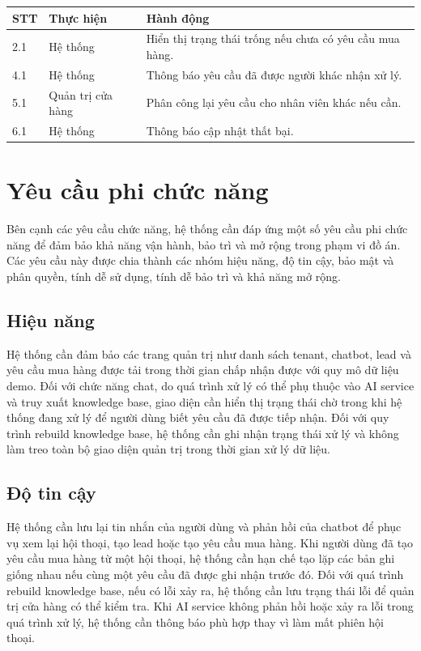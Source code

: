 \documentclass[../DoAn.tex]{subfiles}
\begin{document}
\begin{table}[H]
\centering
\begin{tabular}{|p{}|p{}|p{}|}
\hline
\textbf{STT} & \textbf{Thực hiện} & \textbf{Hành động} \\
\hline
2.1 & Hệ thống & Hiển thị trạng thái trống nếu chưa có yêu cầu mua hàng. \\
\hline
4.1 & Hệ thống & Thông báo yêu cầu đã được người khác nhận xử lý. \\
\hline
5.1 & Quản trị cửa hàng & Phân công lại yêu cầu cho nhân viên khác nếu cần. \\
\hline
6.1 & Hệ thống & Thông báo cập nhật thất bại. \\
\hline
\end{tabular}
\end{table}

\section{Yêu cầu phi chức năng}
\label{section:2.4}

Bên cạnh các yêu cầu chức năng, hệ thống cần đáp ứng một số yêu cầu phi chức năng để đảm bảo khả năng vận hành, bảo trì và mở rộng trong phạm vi đồ án. Các yêu cầu này được chia thành các nhóm hiệu năng, độ tin cậy, bảo mật và phân quyền, tính dễ sử dụng, tính dễ bảo trì và khả năng mở rộng.

\subsection{Hiệu năng}

Hệ thống cần đảm bảo các trang quản trị như danh sách tenant, chatbot, lead và yêu cầu mua hàng được tải trong thời gian chấp nhận được với quy mô dữ liệu demo. Đối với chức năng chat, do quá trình xử lý có thể phụ thuộc vào AI service và truy xuất knowledge base, giao diện cần hiển thị trạng thái chờ trong khi hệ thống đang xử lý để người dùng biết yêu cầu đã được tiếp nhận. Đối với quy trình rebuild knowledge base, hệ thống cần ghi nhận trạng thái xử lý và không làm treo toàn bộ giao diện quản trị trong thời gian xử lý dữ liệu.

\subsection{Độ tin cậy}

Hệ thống cần lưu lại tin nhắn của người dùng và phản hồi của chatbot để phục vụ xem lại hội thoại, tạo lead hoặc tạo yêu cầu mua hàng. Khi người dùng đã tạo yêu cầu mua hàng từ một hội thoại, hệ thống cần hạn chế tạo lặp các bản ghi giống nhau nếu cùng một yêu cầu đã được ghi nhận trước đó. Đối với quá trình rebuild knowledge base, nếu có lỗi xảy ra, hệ thống cần lưu trạng thái lỗi để quản trị cửa hàng có thể kiểm tra. Khi AI service không phản hồi hoặc xảy ra lỗi trong quá trình xử lý, hệ thống cần thông báo phù hợp thay vì làm mất phiên hội thoại.
\end{document}
